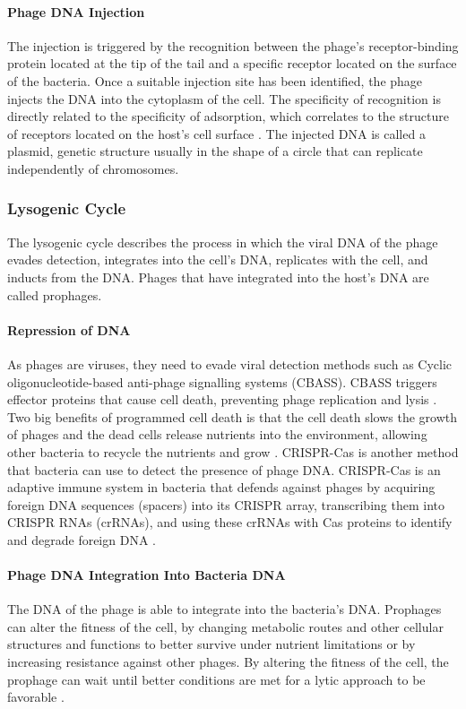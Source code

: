 \paragraph{Phage DNA Injection}
The injection is triggered by the recognition between the phage's receptor-binding protein located at the tip of the tail and a specific receptor located on the surface of the bacteria. 
Once a suitable injection site has been identified, the phage injects the DNA into the cytoplasm of the cell. 
The specificity of recognition is directly related to the specificity of adsorption, which correlates to the structure of receptors located on the host's cell surface \cite{stoneUnderstandingExploitingPhage2019}. 
The injected DNA is called a plasmid, genetic structure usually in the shape of a circle that can replicate independently of chromosomes. 

\subsubsection{Lysogenic Cycle}
The lysogenic cycle describes the process in which the viral DNA of the phage evades detection, integrates into the cell's DNA, replicates with the cell, and inducts from the DNA. 
Phages that have integrated into the host's DNA are called prophages. 
\paragraph{Repression of DNA}
As phages are viruses, they need to evade viral detection methods such as Cyclic oligonucleotide-based anti-phage signalling systems (CBASS). 
CBASS triggers effector proteins that cause cell death, preventing phage replication and lysis \cite{banhBacterialCGASSenses2023}. 
Two big benefits of programmed cell death is that the cell death slows the growth of phages and the dead cells release nutrients into the environment, allowing other bacteria to recycle the nutrients and grow \cite{warwick-dugdaleHosthijackingPlanktonicPiracy2019}. \newline
CRISPR-Cas is another method that bacteria can use to detect the presence of phage DNA. 
CRISPR-Cas is an adaptive immune system in bacteria that defends against phages by acquiring foreign DNA sequences (spacers) into its CRISPR array, transcribing them into CRISPR RNAs (crRNAs), and using these crRNAs with Cas proteins to identify and degrade foreign DNA \cite{levyCRISPRAdaptationBiases2015}. 
\paragraph{Phage DNA Integration Into Bacteria DNA}
The DNA of the phage is able to integrate into the bacteria's DNA. 
Prophages can alter the fitness of the cell, by changing metabolic routes and other cellular structures and functions to better survive under nutrient limitations or by increasing resistance against other phages. 
By altering the fitness of the cell, the prophage can wait until better conditions are met for a lytic approach to be favorable \cite{warwick-dugdaleHosthijackingPlanktonicPiracy2019}. 
